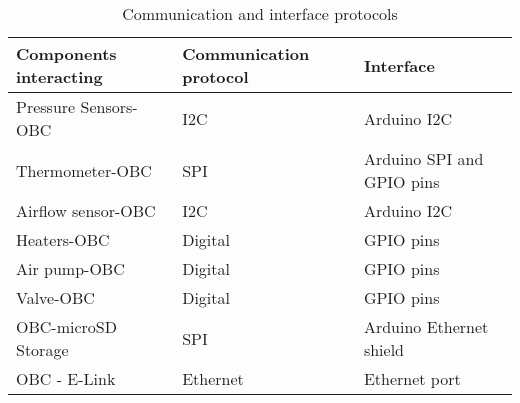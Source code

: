 \begin{table}[H]
\centering
\begin{tabular}{lll}
Components interacting & Communication protocol & Interface                 \\ \hline
Pressure Sensors-OBC   & I2C                    & Arduino I2C \\
Thermometer-OBC        & SPI                    & Arduino SPI and GPIO pins \\
Airflow sensor-OBC     & I2C                    & Arduino I2C \\
Heaters-OBC            & Digital                & GPIO pins \\
Air pump-OBC           & Digital                & GPIO pins \\
Valve-OBC              & Digital                & GPIO pins                 \\
OBC-microSD Storage    & SPI                    & Arduino Ethernet shield   \\
OBC - E-Link           & Ethernet               & Ethernet port            
\end{tabular}%
\caption{Communication and interface protocols}
\label{tab:comIntpro}
\end{table}